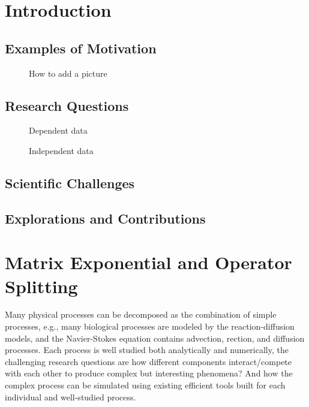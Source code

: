\documentclass[12pt]{article}
\begin{document}
\newpage
\tableofcontents
\newpage
\section{Introduction}

\subsection{Examples of Motivation}

\begin{figure}[h]
  \centering
    \caption{How to add a picture}
\end{figure}

\subsection{Research Questions}
\begin{figure}[h!]
  \centering
  \begin{minipage}[b]{0.45\linewidth}
    \caption{Dependent data}
	\label{fig:research1}
  \end{minipage}
  \hspace{0.5cm}
  \begin{minipage}[b]{0.45\linewidth}
    \caption{Independent data}
	\label{fig:research2}
  \end{minipage}
\end{figure}

\subsection{Scientific Challenges}

\subsection{Explorations and Contributions}

\section{Matrix Exponential and Operator Splitting} 
Many physical processes can be decomposed as the combination of simple processes,
e.g., many biological processes are modeled by the reaction-diffusion models, and the 
Navier-Stokes equation contains advection, rection, and diffusion processes. Each
process is well studied both analytically and numerically, the challenging research questions
are how different components interact/compete with each other to produce complex but interesting
phenomena? And how the complex process can be simulated using existing efficient tools built 
for each individual and well-studied process.
\end{document}
